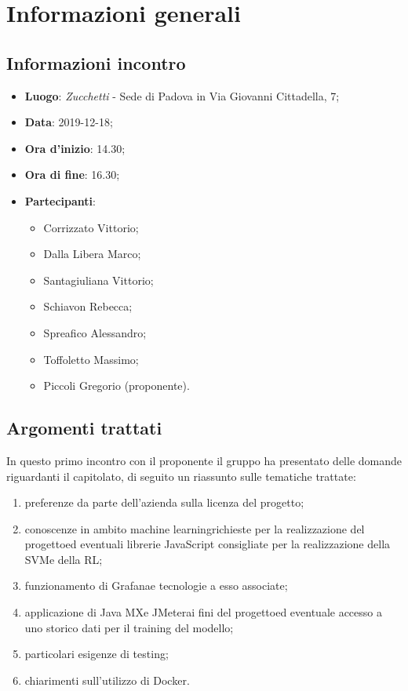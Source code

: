 \section{Informazioni generali}
    \subsection{Informazioni incontro}
        \begin{itemize}
            \item \textbf{Luogo}: \textit{Zucchetti} - Sede di Padova in Via Giovanni Cittadella, 7;
            \item \textbf{Data}: 2019-12-18;
            \item \textbf{Ora d'inizio}: 14.30;
            \item \textbf{Ora di fine}: 16.30;
            \item \textbf{Partecipanti}: \begin{itemize}
                \item Corrizzato Vittorio;
                \item Dalla Libera Marco;
                \item Santagiuliana Vittorio;
                \item Schiavon Rebecca;
                \item Spreafico Alessandro;
                \item Toffoletto Massimo;
                \item Piccoli Gregorio (proponente).
            \end{itemize}
        \end{itemize}
    \subsection{Argomenti trattati}
        In questo primo incontro con il proponente il gruppo ha presentato delle domande riguardanti il capitolato, di seguito un riassunto sulle tematiche trattate:
        \begin{enumerate}
            \item preferenze da parte dell'azienda sulla licenza del progetto;
            \item conoscenze in ambito machine learning\glosp richieste per la realizzazione del progetto\glo ed eventuali librerie JavaScript consigliate per la               realizzazione della SVM\glosp e della RL\glo;
            \item funzionamento di Grafana\glosp e tecnologie a esso associate;
            \item applicazione di Java MX\glosp e JMeter\glosp ai fini del progetto\glosp ed eventuale accesso a uno storico dati per il training del modello;
            \item particolari esigenze di testing;
            \item chiarimenti sull'utilizzo di Docker.
        \end{enumerate}
